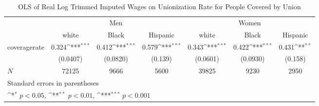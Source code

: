 \begin{table}[htbp]\centering
\def\sym#1{\ifmmode^{#1}\else\(^{#1}\)\fi}
\caption{OLS of Real Log Trimmed Imputed Wages on Unionization Rate for People Covered by Union}
\begin{tabular}{l*{6}{c}}
\hline\hline
            &\multicolumn{3}{c}{Men}                                          &\multicolumn{3}{c}{Women}                                        \\\cmidrule(lr){2-4}\cmidrule(lr){5-7}
            &\multicolumn{1}{c}{white}&\multicolumn{1}{c}{Black}&\multicolumn{1}{c}{Hispanic}&\multicolumn{1}{c}{white}&\multicolumn{1}{c}{Black}&\multicolumn{1}{c}{Hispanic}\\
\hline
coveragerate&       0.324\sym{***}&       0.412\sym{***}&       0.579\sym{***}&       0.343\sym{***}&       0.422\sym{***}&       0.431\sym{**} \\
            &    (0.0407)         &    (0.0820)         &     (0.139)         &    (0.0601)         &    (0.0930)         &     (0.158)         \\
\hline
\(N\)       &       72125         &        9666         &        5600         &       39825         &        9230         &        2950         \\
\hline\hline
\multicolumn{7}{l}{\footnotesize Standard errors in parentheses}\\
\multicolumn{7}{l}{\footnotesize \sym{*} \(p<0.05\), \sym{**} \(p<0.01\), \sym{***} \(p<0.001\)}\\
\end{tabular}
\end{table}

